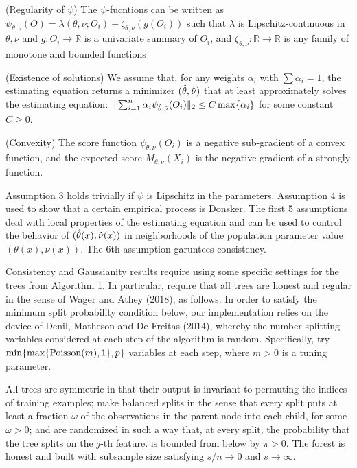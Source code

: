 \begin{assumption}{(Regularity of $\psi$) }
\label{as:psi_regularity}
The $\psi$-fucntions can be written as $\psi_{\theta, \nu}(O) = \lambda(\theta, \nu; O_i) + \zeta_{\theta, \nu}(g(O_i))$ such that $\lambda$ is Lipschitz-continuous in $\theta, \nu$ and $g: {O_i} \rightarrow \mathbb{R}$ is a univariate summary of $O_i$, and $\zeta_{\theta, \nu}: \mathbb{R} \rightarrow \mathbb{R}$ is any family of monotone and bounded functions
\end{assumption}
\begin{assumption}{(Existence of solutions) }
\label{as:existence}
We assume that, for any weights $\alpha_i$ with $\sum \alpha_i = 1$, the estimating equation returns a minimizer $(\hat{\theta}, \hat{\nu})$ that at least approximately solves the estimating equation: $\Vert \sum_{i=1}^n \alpha_i \psi_{\hat{\theta}, \hat{\nu}}(O_i)\Vert_2 \leq C \max\{\alpha_i\}$ for some constant $C\geq 0$. 
\end{assumption}

\begin{assumption}{(Convexity) }
\label{as:convexity}
The score function $\psi_{\theta, \nu}(O_i)$ is a negative sub-gradient of a convex function, and the expected score $M_{\theta, \nu}(X_i)$ is the negative gradient of a strongly function. 
\end{assumption}
Assumption 3 holds trivially if $\psi$ is Lipschitz in the parameters. Assumption 4 is used to show that a certain empirical process is Donsker. The first 5 assumptions deal with local properties of the estimating equation and can be used to control the behavior of $(\hat{\theta}(x), \hat{\nu}(x))$ in neighborhoods of the population parameter value $(\theta(x), \nu(x))$. The 6th assumption garuntees consistency. 

Consistency and Gaussianity results require using some specific settings for the trees from Algorithm 1. In particular, require that all trees are honest and regular in the sense of Wager and Athey (2018), as follows. In order to satisfy the minimum split probability condition below, our implementation relies on the device of Denil, Matheson and De Freitas (2014), whereby the number splitting variables considered at each step of the algorithm is random. Specifically, try $\min\{\max\{\operatorname{Poisson}(m), 1\},p\}$ variables at each step, where $m > 0$ is a tuning parameter.
\begin{specification}
All trees are symmetric in that their output is invariant to permuting the indices of training examples; make balanced splits in the sense that every split puts at least a fraction $\omega$ of the observations in the parent node into each child, for some $\omega > 0$; and are randomized in such a way that, at every split, the probability that the tree splits on the $j$-th feature. is bounded from below by $\pi > 0$. The forest is honest and built with subsample size satisfying $s/n \rightarrow 0$ and $s \rightarrow \infty$.
\end{specification}


